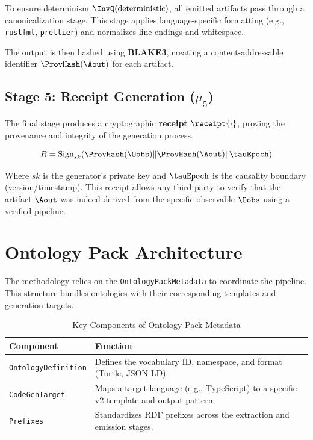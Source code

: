 To ensure determinism $\InvQ(\text{deterministic})$, all emitted artifacts pass through a canonicalization stage. This stage applies language-specific formatting (e.g., \texttt{rustfmt}, \texttt{prettier}) and normalizes line endings and whitespace.

The output is then hashed using \textbf{BLAKE3}, creating a content-addressable identifier $\ProvHash(\Aout)$ for each artifact.

\subsection{Stage 5: Receipt Generation (\(\mu_5\))}

The final stage produces a cryptographic \textbf{receipt} $\receipt{\cdot}$, proving the provenance and integrity of the generation process.

\begin{equation}
R = \text{Sign}_{sk}(\ProvHash(\Oobs) \| \ProvHash(\Aout) \| \tauEpoch)
\end{equation}

Where $sk$ is the generator's private key and $\tauEpoch$ is the causality boundary (version/timestamp). This receipt allows any third party to verify that the artifact $\Aout$ was indeed derived from the specific observable $\Oobs$ using a verified pipeline.

\section{Ontology Pack Architecture}

The methodology relies on the \texttt{OntologyPackMetadata} to coordinate the pipeline. This structure bundles ontologies with their corresponding templates and generation targets.

\begin{table}[h]
\centering
\caption{Key Components of Ontology Pack Metadata}
\begin{tabular}{lp{8cm}}
\toprule
\textbf{Component} & \textbf{Function} \\
\midrule
\texttt{OntologyDefinition} & Defines the vocabulary ID, namespace, and format (Turtle, JSON-LD). \\
\texttt{CodeGenTarget} & Maps a target language (e.g., TypeScript) to a specific v2 template and output pattern. \\
\texttt{Prefixes} & Standardizes RDF prefixes across the extraction and emission stages. \\
\bottomrule
\end{tabular}
\end{table}

